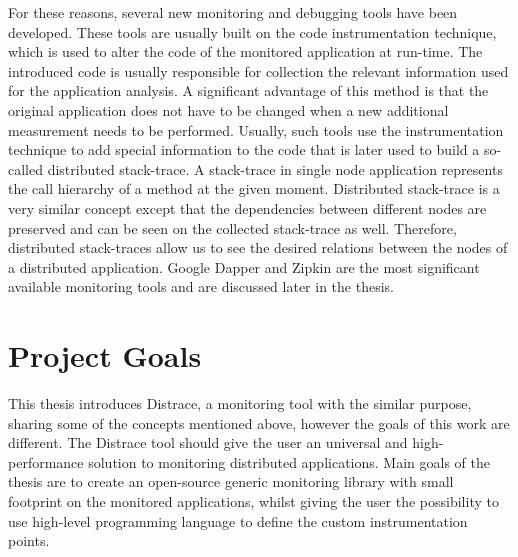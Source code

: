 For these reasons, several new monitoring and debugging tools have been developed. These tools are usually built on the code instrumentation technique, which is used to alter the code of the monitored application at run-time. The introduced code is usually responsible for collection the relevant information used for the application analysis. A significant advantage of this method is that the original application does not have to be changed when a new additional measurement needs to be performed. Usually, such tools use the instrumentation technique to add special information to the code that is later used to build a so-called distributed stack-trace. A stack-trace in single node application represents the call hierarchy of a method at the given moment. Distributed stack-trace is a very similar concept except that the dependencies between different nodes are preserved and can be seen on the collected stack-trace as well. Therefore, distributed stack-traces allow us to see the desired relations between the nodes of a distributed application. Google Dapper and Zipkin are the most significant available monitoring tools and are discussed later in the thesis. 


\section{Project Goals}
This thesis introduces Distrace, a monitoring tool with the similar purpose, sharing some of the concepts mentioned above, however the goals of this work are different. The Distrace tool should give the user an universal and high-performance solution to monitoring distributed applications. Main goals of the thesis are to create an open-source generic monitoring library with small footprint on the monitored applications, whilst giving the user the possibility to use high-level programming language to define the custom instrumentation points.


